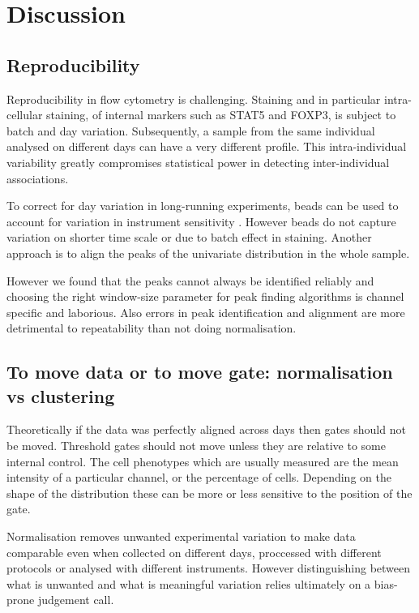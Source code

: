 \chapter{Discussion}

\section{Reproducibility}


Reproducibility in flow cytometry is challenging. 
Staining and in particular intra-cellular staining, of internal markers such as STAT5 and FOXP3, is subject to batch and day variation.
Subsequently, a sample from the same individual analysed on different days can have a very different profile.
This intra-individual variability greatly compromises statistical power in detecting inter-individual associations.

To correct for day variation in long-running experiments, beads can be used to account for variation in instrument sensitivity \citep{Dendrou:2009bl}.
However beads do not capture variation on shorter time scale or due to batch effect in staining.
Another approach is to align the peaks of the univariate distribution in the whole sample.


However we found that the peaks cannot always be identified reliably and choosing the right window-size parameter for peak finding algorithms is channel specific and laborious.
Also errors in peak identification and alignment are more detrimental to repeatability than not doing normalisation.



\section{To move data or to move gate: normalisation vs clustering}


Theoretically if the data was perfectly aligned across days then gates should not be moved.  
Threshold gates should not move unless they are relative to some internal control.
The cell phenotypes which are usually measured are the mean intensity of a particular channel, or the percentage of cells.
Depending on the shape of the distribution these can be more or less sensitive to the position of the gate.



Normalisation removes unwanted experimental variation to make data comparable even when collected on different days, proccessed with different protocols or analysed with different instruments.
However distinguishing between what is unwanted and what is meaningful variation relies ultimately on a bias-prone judgement call.

